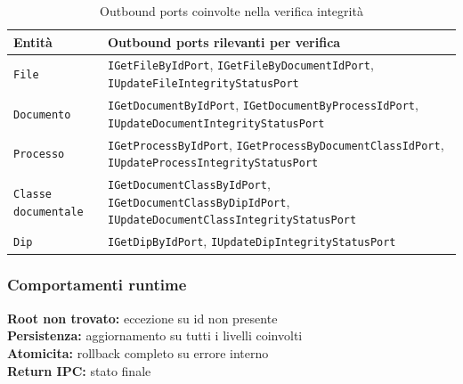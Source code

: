 \begin{table}[H]
	\centering
	\footnotesize
	\setlength{\tabcolsep}{4pt}
	\renewcommand{\arraystretch}{1.5}
	\begin{tabularx}{\textwidth}{|l|Y|}
		\hline
		\textbf{Entità} & \textbf{Outbound ports rilevanti per verifica} \\
		\hline
		\texttt{File} & \texttt{IGetFileByIdPort}, \texttt{IGetFileByDocumentIdPort}, \texttt{IUpdateFileIntegrityStatusPort} \\
		\hline
		\texttt{Documento} & \texttt{IGetDocumentByIdPort}, \texttt{IGetDocumentByProcessIdPort}, \texttt{IUpdateDocumentIntegrityStatusPort} \\
		\hline
		\texttt{Processo} & \texttt{IGetProcessByIdPort}, \texttt{IGetProcessByDocumentClassIdPort}, \texttt{IUpdateProcessIntegrityStatusPort} \\
		\hline
		\texttt{Classe documentale} & \texttt{IGetDocumentClassByIdPort}, \texttt{IGetDocumentClassByDipIdPort}, \texttt{IUpdateDocumentClassIntegrityStatusPort} \\
		\hline
		\texttt{Dip} & \texttt{IGetDipByIdPort}, \texttt{IUpdateDipIntegrityStatusPort} \\
		\hline
	\end{tabularx}
	\caption{Outbound ports coinvolte nella verifica integrità}
	\label{tab:integrity:repo-dao}
\end{table}

\subsubsection{Comportamenti runtime}
\label{sec:integrity:runtime}

\noindent
\textbf{Root non trovato:} eccezione su id non presente\\
\textbf{Persistenza:} aggiornamento  su tutti i livelli coinvolti\\
\textbf{Atomicita:} rollback completo su errore interno\\
\textbf{Return IPC:} stato finale 

\newpage
